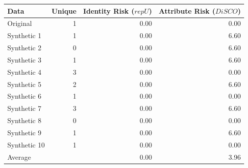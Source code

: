 \begin{tabular}{lrrr}
  \toprule
Data & Unique & Identity Risk ($repU$) & Attribute Risk ($DiSCO$) \\ 
  \midrule
Original &   1 & 0.00 & 0.00 \\ 
  Synthetic 1 &   1 & 0.00 & 6.60 \\ 
  Synthetic 2 &   0 & 0.00 & 6.60 \\ 
  Synthetic 3 &   1 & 0.00 & 6.60 \\ 
  Synthetic 4 &   3 & 0.00 & 0.00 \\ 
  Synthetic 5 &   2 & 0.00 & 6.60 \\ 
  Synthetic 6 &   1 & 0.00 & 0.00 \\ 
  Synthetic 7 &   3 & 0.00 & 6.60 \\ 
  Synthetic 8 &   0 & 0.00 & 0.00 \\ 
  Synthetic 9 &   1 & 0.00 & 6.60 \\ 
  Synthetic 10 &   1 & 0.00 & 0.00 \\ 
   \midrule 
Average &  & 0.00 & 3.96 \\ 
   \bottomrule
\end{tabular}
